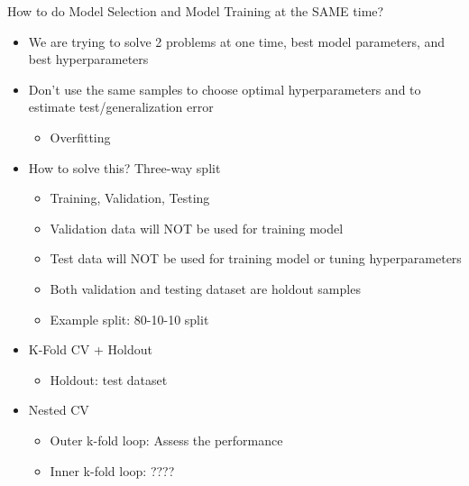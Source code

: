 \documentclass[10pt, oneside]{article}
\begin{document}
How to do Model Selection and Model Training at the SAME time?
\begin{itemize}
    \item We are trying to solve 2 problems at one time, best model parameters, and best hyperparameters
    \item Don't use the same samples to choose optimal hyperparameters and to estimate test/generalization error
    \begin{itemize}
        \item Overfitting
    \end{itemize}
    \item How to solve this? Three-way split
    \begin{itemize}
        \item Training, Validation, Testing
        \item Validation data will NOT be used for training model
        \item Test data will NOT be used for training model or tuning hyperparameters
        \item Both validation and testing dataset are holdout samples
        \item Example split: 80-10-10 split
    \end{itemize}
    \item K-Fold CV + Holdout
    \begin{itemize}
        \item Holdout: test dataset
    \end{itemize}
    \item Nested CV
    \begin{itemize}
        \item Outer k-fold loop: Assess the performance
        \item Inner k-fold loop: ????
    \end{itemize}
\end{itemize}
\end{document}
